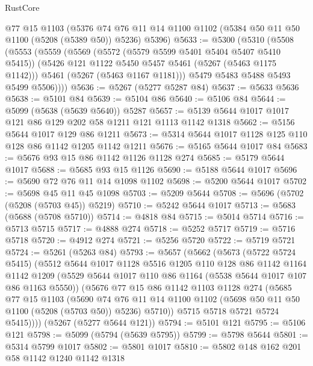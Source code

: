\begin{lexlean}{RustCore}
\begin{coremodule}
    @77
    @15
    @1103
    (@5376 @74 @76 @11 @14 @1100 @1102 (@5384 @50 @11 @50 @1100 (@5208 (@5389 @50)) @5236) @5396)
@5633 := @5300
    (@5310
      (@5508
        (@5553
          (@5559
            (@5569
              (@5572 (@5579 @5599 @5401 @5404 @5407 @5410 @5415))
              (@5426 @121 @1122 @5450 @5457 @5461 (@5267 (@5463 @1175 @1142)))
              @5461
              (@5267 (@5463 @1167 @1181)))
            @5479
            @5483
            @5488
            @5493
            @5499
            @5506))))
@5636 := @5267 (@5277 @5287 @84)
@5637 := @5633 @5636
@5638 := @5101 @84
@5639 := @5104 @86
@5640 := @5106 @84
@5644 := @5099 (@5638 (@5639 @5640)) @5287
@5657 := @5139 @5644 @1017 @1017 @121 @86 @129 @202 @58 @1211 @121 @1113 @1142 @1318
@5662 := @5156 @5644 @1017 @129 @86 @1211
@5673 := @5314 @5644 @1017 @1128 @125 @110 @128 @86 @1142 @1205 @1142 @1211
@5676 := @5165 @5644 @1017 @84
@5683 := @5676 @93 @15 @86 @1142 @1126 @1128 @274
@5685 := @5179 @5644 @1017
@5688 := @5685 @93 @15 @1126
@5690 := @5188 @5644 @1017
@5696 := @5690 @72 @76 @11 @14 @1098 @1102
@5698 := @5200 @5644 @1017
@5702 := @5698 @45 @11 @45 @1098
@5703 := @5209 @5644
@5708 := @5696 (@5702 (@5208 (@5703 @45)) @5219)
@5710 := @5242 @5644 @1017
@5713 := @5683 (@5688 (@5708 @5710))
@5714 := @4818 @84
@5715 := @5014 @5714
@5716 := @5713 @5715
@5717 := @4888 @274
@5718 := @5252 @5717
@5719 := @5716 @5718
@5720 := @4912 @274
@5721 := @5256 @5720
@5722 := @5719 @5721
@5724 := @5261 (@5263 @84)
@5793 := @5657
    (@5662
      (@5673
        (@5722 @5724 @5415)
        (@5512
          @5644
          @1017
          @1128
          @5516
          @1205
          @110
          @128
          @86
          @1142
          @1164
          @1142
          @1209
          (@5529 @5644 @1017 @110 @86 @1164 (@5538 @5644 @1017 @107 @86 @1163 @5550))
          (@5676
            @77
            @15
            @86
            @1142
            @1103
            @1128
            @274
            (@5685
              @77
              @15
              @1103
              (@5690
                @74
                @76
                @11
                @14
                @1100
                @1102
                (@5698 @50 @11 @50 @1100 (@5208 (@5703 @50)) @5236)
                @5710))
            @5715
            @5718
            @5721
            @5724
            @5415))))
    (@5267 (@5277 @5644 @121))
@5794 := @5101 @121
@5795 := @5106 @121
@5798 := @5099 (@5794 (@5639 @5795))
@5799 := @5798 @5644
@5801 := @5314 @5799 @1017
@5802 := @5801 @1017
@5810 := @5802 @148 @162 @201 @58 @1142 @1240 @1142 @1318

\end{coremodule}
\end{lexlean}
